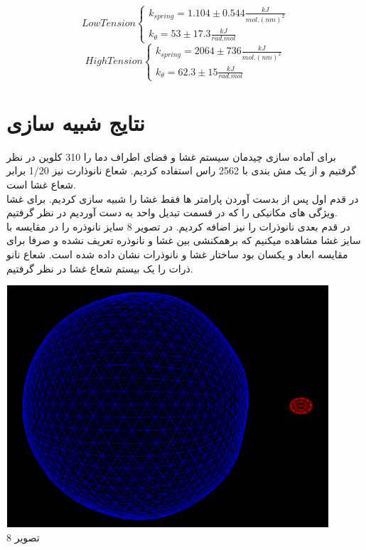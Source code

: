 \documentclass[12pt,onecolumn,a4paper]{report}
\begin{document}
\[ Low Tension 
  \begin{cases}
    k_{spring} = 1.104 \pm 0.544 \frac{kJ}{mol.(nm)^2}\\
    k_\theta = 53 \pm 17.3 \frac{kJ}{rad.mol}
  \end{cases}
\]
\[ High Tension 
  \begin{cases}
    k_{spring} = 2064 \pm 736 \frac{kJ}{mol.(nm)^2}\\
    k_\theta = 62.3 \pm 15 \frac{kJ}{rad.mol}
  \end{cases}
\]



\section{\LARGE{نتایج شبیه سازی}}
برای آماده سازی چیدمان سیستم غشا و فضای اطراف دما را 310 کلوین در نظر گرفتیم و از یک مش بندی با 2562 راس استفاده کردیم. شعاع نانوذارت نیز 1/20 برابر شعاع غشا است.\\
در قدم اول پس از بدست آوردن پارامتر ها فقط غشا را شبیه سازی کردیم. برای غشا ویژگی های مکانیکی  را که در قسمت تبدیل واحد به دست آوردیم در نظر گرفتیم.\\
در قدم بعدی نانوذرات را نیز اضافه کردیم.  در تصویر 8 سایز نانوذره را در مقایسه با سایز غشا مشاهده میکنیم که برهمکنشی بین غشا و نانوذره تعریف نشده و صرفا برای مقایسه ابعاد و یکسان بود ساختار غشا و نانوذرات نشان داده شده است. شعاع نانو ذرات را یک بیستم شعاع غشا در نظر گرفتیم.
\begin{center}
\includegraphics[width=12cm, height=9cm]{08.png}\\
\caption{تصویر 8}
\end{center}\\
\end{document}
